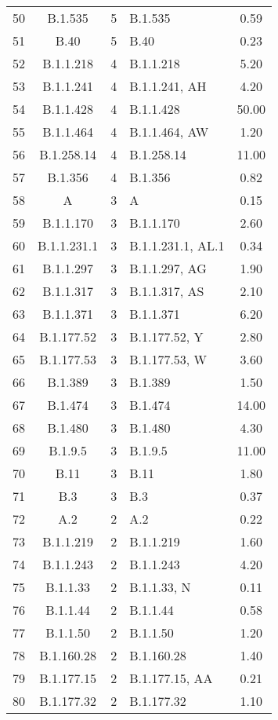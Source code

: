 \begin{longtable}[l]{cccP{4cm}c}
  50 & B.1.535 &   5 & B.1.535 & 0.59 \\ 
  51 & B.40 &   5 & B.40 & 0.23 \\ 
  52 & B.1.1.218 &   4 & B.1.1.218 & 5.20 \\ 
  53 & B.1.1.241 &   4 & B.1.1.241, AH & 4.20 \\ 
  54 & B.1.1.428 &   4 & B.1.1.428 & 50.00 \\ 
  55 & B.1.1.464 &   4 & B.1.1.464, AW & 1.20 \\ 
  56 & B.1.258.14 &   4 & B.1.258.14 & 11.00 \\ 
  57 & B.1.356 &   4 & B.1.356 & 0.82 \\ 
  58 & A &   3 & A & 0.15 \\ 
  59 & B.1.1.170 &   3 & B.1.1.170 & 2.60 \\ 
  60 & B.1.1.231.1 &   3 & B.1.1.231.1, AL.1 & 0.34 \\ 
  61 & B.1.1.297 &   3 & B.1.1.297, AG & 1.90 \\ 
  62 & B.1.1.317 &   3 & B.1.1.317, AS & 2.10 \\ 
  63 & B.1.1.371 &   3 & B.1.1.371 & 6.20 \\ 
  64 & B.1.177.52 &   3 & B.1.177.52, Y & 2.80 \\ 
  65 & B.1.177.53 &   3 & B.1.177.53, W & 3.60 \\ 
  66 & B.1.389 &   3 & B.1.389 & 1.50 \\ 
  67 & B.1.474 &   3 & B.1.474 & 14.00 \\ 
  68 & B.1.480 &   3 & B.1.480 & 4.30 \\ 
  69 & B.1.9.5 &   3 & B.1.9.5 & 11.00 \\ 
  70 & B.11 &   3 & B.11 & 1.80 \\ 
  71 & B.3 &   3 & B.3 & 0.37 \\ 
  72 & A.2 &   2 & A.2 & 0.22 \\ 
  73 & B.1.1.219 &   2 & B.1.1.219 & 1.60 \\ 
  74 & B.1.1.243 &   2 & B.1.1.243 & 4.20 \\ 
  75 & B.1.1.33 &   2 & B.1.1.33, N & 0.11 \\ 
  76 & B.1.1.44 &   2 & B.1.1.44 & 0.58 \\ 
  77 & B.1.1.50 &   2 & B.1.1.50 & 1.20 \\ 
  78 & B.1.160.28 &   2 & B.1.160.28 & 1.40 \\ 
  79 & B.1.177.15 &   2 & B.1.177.15, AA & 0.21 \\ 
  80 & B.1.177.32 &   2 & B.1.177.32 & 1.10 \\ 

\end{longtable}
